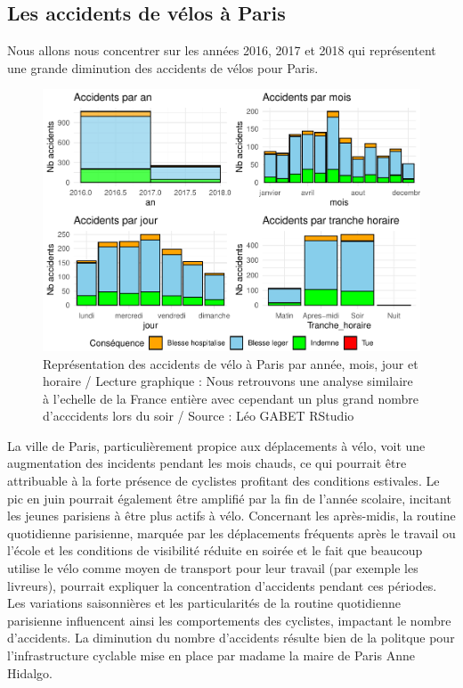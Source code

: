 \documentclass[french,]{compterendu}
\theoremstyle{urcastyle}
\theoremstyle{remark}
\begin{document}
\hypertarget{les-accidents-de-vuxe9los-uxe0-paris}{%
\subsection{Les accidents de vélos à Paris}\label{les-accidents-de-vuxe9los-uxe0-paris}}

Nous allons nous concentrer sur les années 2016, 2017 et 2018 qui représentent une grande diminution des accidents de vélos pour Paris.

\begin{figure}[H]

{\centering \includegraphics[width=0.9\linewidth]{Rapport_ADD_LEO-GABET_files/figure-latex/accParisdetail-1} 

}

\caption{Représentation des accidents de vélo à Paris par année, mois, jour et horaire / Lecture graphique : Nous retrouvons une analyse similaire à l'echelle de la France entière avec cependant un plus grand nombre d'acccidents lors du soir / Source : Léo GABET RStudio}\label{fig:accParisdetail}
\end{figure}

La ville de Paris, particulièrement propice aux déplacements à vélo, voit une augmentation des incidents pendant les mois chauds, ce qui pourrait être attribuable à la forte présence de cyclistes profitant des conditions estivales. Le pic en juin pourrait également être amplifié par la fin de l'année scolaire, incitant les jeunes parisiens à être plus actifs à vélo.
Concernant les après-midis, la routine quotidienne parisienne, marquée par les déplacements fréquents après le travail ou l'école et les conditions de visibilité réduite en soirée et le fait que beaucoup utilise le vélo comme moyen de transport pour leur travail (par exemple les livreurs), pourrait expliquer la concentration d'accidents pendant ces périodes.
Les variations saisonnières et les particularités de la routine quotidienne parisienne influencent ainsi les comportements des cyclistes, impactant le nombre d'accidents.
La diminution du nombre d'accidents résulte bien de la politque pour l'infrastructure cyclable mise en place par madame la maire de Paris Anne Hidalgo.
\end{document}
